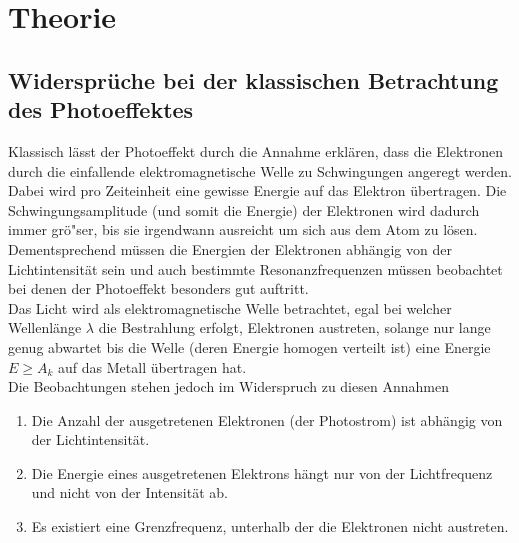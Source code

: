 \section{Theorie}
\subsection{Widersprüche bei der klassischen Betrachtung des Photoeffektes}
Klassisch lässt der Photoeffekt durch die Annahme erklären, 
dass die Elektronen durch die einfallende elektromagnetische Welle zu Schwingungen angeregt werden. 
Dabei wird pro Zeiteinheit eine gewisse Energie auf das Elektron übertragen. 
Die Schwingungsamplitude (und somit die Energie) der Elektronen wird dadurch immer grö"ser,
 bis sie irgendwann ausreicht um sich aus dem Atom zu lösen.\\
Dementsprechend müssen die Energien der Elektronen abhängig von der Lichtintensität sein und
 auch bestimmte Resonanzfrequenzen müssen beobachtet bei denen der Photoeffekt besonders gut auftritt.\\
 Das Licht wird als elektromagnetische Welle betrachtet, egal bei welcher Wellenlänge $\lambda$ die Bestrahlung erfolgt,
  Elektronen austreten, solange nur lange genug abwartet bis die Welle (deren Energie homogen verteilt ist) eine Energie $E \geq A_k$ auf das Metall übertragen hat.\\
Die Beobachtungen stehen jedoch im Widerspruch zu diesen Annahmen
\begin{enumerate}
 \item Die Anzahl der ausgetretenen Elektronen (der Photostrom) ist abhängig von der Lichtintensität.
 \item Die Energie eines ausgetretenen Elektrons hängt nur von der Lichtfrequenz und nicht von der Intensität ab.
 \item Es existiert eine Grenzfrequenz, unterhalb der die Elektronen nicht austreten.
\end{enumerate}
